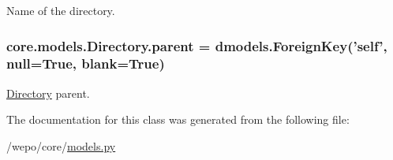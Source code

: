 Name of the directory. 

\hypertarget{classcore_1_1models_1_1Directory_ad0341e7ba04c23d665cb318ebee17c2b}{
\subsubsection[{parent}]{\setlength{\rightskip}{0pt plus 5cm}core.\-models.\-Directory.\-parent = dmodels.\-Foreign\-Key('self', null=True, blank=True)\hspace{0.3cm}{\ttfamily [static]}}}\label{classcore_1_1models_1_1Directory_ad0341e7ba04c23d665cb318ebee17c2b}


\hyperlink{classcore_1_1models_1_1Directory}{Directory} parent. 



The documentation for this class was generated from the following file\-:\begin{DoxyCompactItemize}
\item 
/wepo/core/\hyperlink{models_8py}{models.\-py}\end{DoxyCompactItemize}
